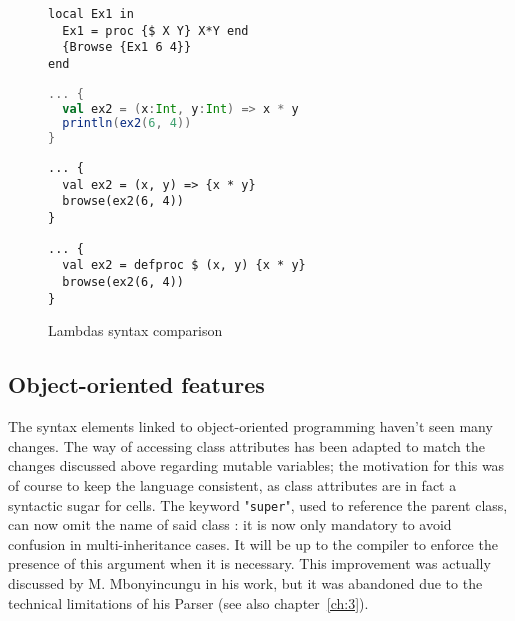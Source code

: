 \begin{figure}
    \noindent\begin{minipage}{.49\textwidth}
                 \begin{lstlisting}[title={Oz},language=oz]
local Ex1 in
  Ex1 = proc {$ X Y} X*Y end
  {Browse {Ex1 6 4}}
end
                 \end{lstlisting}
    \end{minipage}
    \hfill
    \noindent\begin{minipage}{.49\textwidth}
                 \begin{lstlisting}[title={Scala/Ozma},language=scala]
... {
  val ex2 = (x:Int, y:Int) => x * y
  println(ex2(6, 4))
}
                 \end{lstlisting}
    \end{minipage}
    \noindent\begin{minipage}{.49\textwidth}
                 \begin{lstlisting}[title={NewOz 2020},language=newoz]
... {
  val ex2 = (x, y) => {x * y}
  browse(ex2(6, 4))
}
                 \end{lstlisting}
    \end{minipage}
    \hfill
    \noindent\begin{minipage}{.49\textwidth}
                 \begin{lstlisting}[title={NewOz 2021},language=newoz]
... {
  val ex2 = defproc $ (x, y) {x * y}
  browse(ex2(6, 4))
}
                 \end{lstlisting}
    \end{minipage}
\caption{Lambdas syntax comparison}
\label{fig:code-comp-lambda}
\end{figure}

\subsection{Object-oriented features}
The syntax elements linked to object-oriented programming haven't seen many changes.
The way of accessing class attributes has been adapted to match the changes discussed above regarding mutable variables;
the motivation for this was of course to keep the language consistent, as class attributes are in fact a syntactic sugar for cells.
The keyword "\texttt{super}", used to reference the parent class, can now omit the name of said class : it is now only mandatory to avoid confusion in multi-inheritance cases.
It will be up to the compiler to enforce the presence of this argument when it is necessary.
This improvement was actually discussed by M. Mbonyincungu in his work, but it was abandoned due to the technical limitations of his Parser (see also chapter~\ref{ch:3}).\newline

